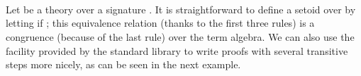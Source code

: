\begin{code}
  \>[2]\AgdaSpace{}%
%
\>[12]\AgdaSymbol{\{}\AgdaSpace{}%
\AgdaSymbol{:}\AgdaSpace{}%
\AgdaSpace{}%
\AgdaSymbol{\}}\AgdaSpace{}%
\AgdaSymbol{(}\AgdaSpace{}%
\AgdaSymbol{:}\AgdaSpace{}%
\AgdaSpace{}%
\AgdaSpace{}%
\AgdaSymbol{)}\AgdaSpace{}%
\AgdaSymbol{:}\AgdaSpace{}%
\AgdaSpace{}%
\AgdaSymbol{\{}\AgdaSymbol{\}}\AgdaSpace{}%
\AgdaSpace{}%
\AgdaSpace{}%
\AgdaSpace{}%
\AgdaSpace{}%
\AgdaSpace{}%
\AgdaSpace{}%
\<%
\\
\>[4]\AgdaSpace{}%
\AgdaSymbol{:}\AgdaSpace{}%
\AgdaSpace{}%
\AgdaSymbol{\{}\AgdaSymbol{\}}%
\>[750I]\AgdaSymbol{\{}\AgdaSpace{}%
\AgdaSpace{}%
\AgdaSpace{}%
\AgdaSymbol{:}\AgdaSpace{}%
\AgdaSpace{}%
\AgdaSpace{}%
\AgdaSpace{}%
\AgdaSpace{}%
\AgdaSpace{}%
\AgdaSymbol{\}}\AgdaSpace{}%
\<%
\\
\>[.][@{}l@{}]\<[750I]%
\>[19]\AgdaSpace{}%
\AgdaSpace{}%
\AgdaSymbol{(}\AgdaSpace{}%
\AgdaSpace{}%
\AgdaSpace{}%
\AgdaSymbol{)}\AgdaSpace{}%
\AgdaSpace{}%
\AgdaSpace{}%
\AgdaSpace{}%
\AgdaSymbol{(}\AgdaSpace{}%
\AgdaSpace{}%
\AgdaSpace{}%
\AgdaSymbol{)}\AgdaSpace{}%
\AgdaSpace{}%
\AgdaSpace{}%
\AgdaSpace{}%
\AgdaSymbol{(}\AgdaSpace{}%
\AgdaSpace{}%
\AgdaSpace{}%
\AgdaSymbol{)}\<%
\\
%
\end{code}

Let  be a theory over a signature . It is
straightforward to define a setoid over
\AgdaSpace{}\AgdaSpace{}
by letting  if
\AgdaSpace{}\AgdaSpace{}; this
equivalence relation (thanks to the first three rules) is a congruence (because
of the last rule) over the term algebra. We can also use the facility provided
by the standard library to write proofs with several transitive steps more
nicely, as can be seen in the next example.


